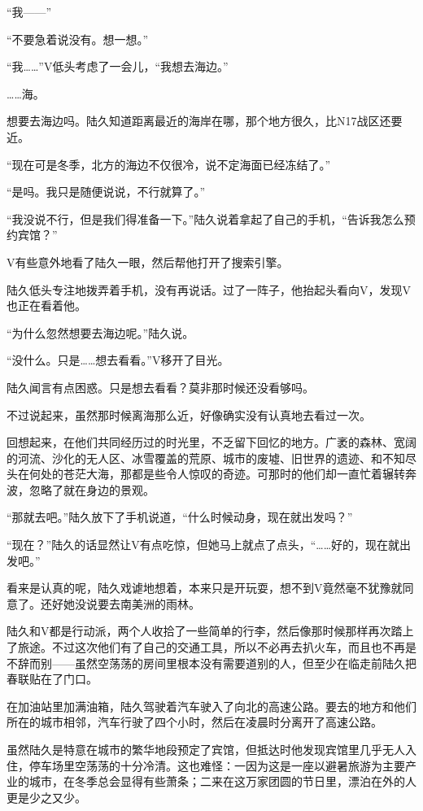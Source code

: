 “我——”

“不要急着说没有。想一想。”

“我……”V低头考虑了一会儿，“我想去海边。”

……海。

想要去海边吗。陆久知道距离最近的海岸在哪，那个地方很久，比N17战区还要近。

“现在可是冬季，北方的海边不仅很冷，说不定海面已经冻结了。”

“是吗。我只是随便说说，不行就算了。”

“我没说不行，但是我们得准备一下。”陆久说着拿起了自己的手机，“告诉我怎么预约宾馆？”

V有些意外地看了陆久一眼，然后帮他打开了搜索引擎。

陆久低头专注地拨弄着手机，没有再说话。过了一阵子，他抬起头看向V，发现V也正在看着他。

“为什么忽然想要去海边呢。”陆久说。

“没什么。只是……想去看看。”V移开了目光。

陆久闻言有点困惑。只是想去看看？莫非那时候还没看够吗。

不过说起来，虽然那时候离海那么近，好像确实没有认真地去看过一次。

回想起来，在他们共同经历过的时光里，不乏留下回忆的地方。广袤的森林、宽阔的河流、沙化的无人区、冰雪覆盖的荒原、城市的废墟、旧世界的遗迹、和不知尽头在何处的苍茫大海，那都是些令人惊叹的奇迹。可那时的他们却一直忙着辗转奔波，忽略了就在身边的景观。

“那就去吧。”陆久放下了手机说道，“什么时候动身，现在就出发吗？”

“现在？”陆久的话显然让V有点吃惊，但她马上就点了点头，“……好的，现在就出发吧。”

看来是认真的呢，陆久戏谑地想着，本来只是开玩耍，想不到V竟然毫不犹豫就同意了。还好她没说要去南美洲的雨林。

陆久和V都是行动派，两个人收拾了一些简单的行李，然后像那时候那样再次踏上了旅途。不过这次他们有了自己的交通工具，所以不必再去扒火车，而且也不再是不辞而别——虽然空荡荡的房间里根本没有需要道别的人，但至少在临走前陆久把春联贴在了门口。

在加油站里加满油箱，陆久驾驶着汽车驶入了向北的高速公路。要去的地方和他们所在的城市相邻，汽车行驶了四个小时，然后在凌晨时分离开了高速公路。

虽然陆久是特意在城市的繁华地段预定了宾馆，但抵达时他发现宾馆里几乎无人入住，停车场里空荡荡的十分冷清。这也难怪：一因为这是一座以避暑旅游为主要产业的城市，在冬季总会显得有些萧条；二来在这万家团圆的节日里，漂泊在外的人更是少之又少。

